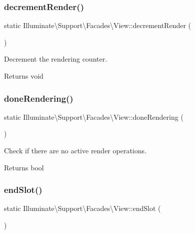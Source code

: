 \subsubsection{\texorpdfstring{decrement\+Render()}{decrementRender()}}
{\footnotesize\ttfamily static Illuminate\textbackslash{}\+Support\textbackslash{}\+Facades\textbackslash{}\+View\+::decrement\+Render (\begin{DoxyParamCaption}{ }\end{DoxyParamCaption})\hspace{0.3cm}{\ttfamily [static]}}

Decrement the rendering counter.

\begin{DoxyReturn}{Returns}
void 
\end{DoxyReturn}
\mbox{\label{class_illuminate_1_1_support_1_1_facades_1_1_view_a74a1cfc9f5696e486e332a1fdfcdeb76}} 
\subsubsection{\texorpdfstring{done\+Rendering()}{doneRendering()}}
{\footnotesize\ttfamily static Illuminate\textbackslash{}\+Support\textbackslash{}\+Facades\textbackslash{}\+View\+::done\+Rendering (\begin{DoxyParamCaption}{ }\end{DoxyParamCaption})\hspace{0.3cm}{\ttfamily [static]}}

Check if there are no active render operations.

\begin{DoxyReturn}{Returns}
bool 
\end{DoxyReturn}
\mbox{\label{class_illuminate_1_1_support_1_1_facades_1_1_view_a5501ede637043e746bf37d08dec1f61a}} 
\subsubsection{\texorpdfstring{end\+Slot()}{endSlot()}}
{\footnotesize\ttfamily static Illuminate\textbackslash{}\+Support\textbackslash{}\+Facades\textbackslash{}\+View\+::end\+Slot (\begin{DoxyParamCaption}{ }\end{DoxyParamCaption})\hspace{0.3cm}{\ttfamily [static]}}

